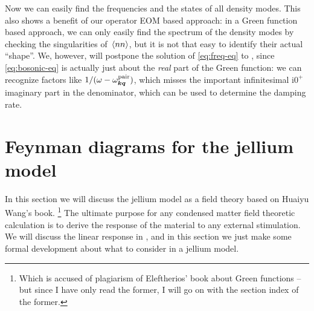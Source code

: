 \documentclass[hyperref, a4paper]{article}
\newcommand*{\ii}{\mathrm{i}}
\begin{document}
Now we can easily find the frequencies and the states of all density modes. This also shows a benefit 
of our operator EOM based approach: in a Green function based approach, we can only easily find the 
spectrum of the density modes by checking the singularities of $\expval*{nn}$, but it is not that 
easy to identify their actual ``shape''. We, however, will postpone the solution of \eqref{eq:freq-eq} \marginnote{}
to , since \eqref{eq:bosonic-eq} is actually just about the \emph{real} part of 
the Green function: we can recognize factors like $1 / (\omega - \omega^\text{pair}_{\vb*{k} \vb*{q}})$,
which misses the important infinitesimal $\ii 0^+$ imaginary part in the denominator, which can be used to 
determine the damping rate.  

\section{Feynman diagrams for the jellium model}\label{sec:green}

In this section we will discuss the jellium model as a field theory based on Huaiyu Wang's book.%
\footnote{Which is accused of plagiarism of Eleftherios' book about Green functions -- but since I have only read the former, I will go on with the section index of the former.} %
The ultimate purpose for any condensed matter field theoretic calculation is to derive the response 
of the material to any external stimulation. We will discuss the linear response in ,
and in this section we just make some formal development about what to consider in a jellium model.
\end{document}
